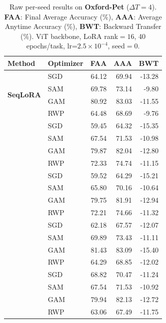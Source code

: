 \begin{table}[ht]
\centering
\caption{%
  Raw per-seed results on \textbf{Oxford-Pet} ($\Delta T=4$).
  \textbf{FAA}: Final Average Accuracy (\%), \textbf{AAA}: Average Anytime Accuracy (\%),
  \textbf{BWT}: Backward Transfer (\%).
  ViT backbone, LoRA rank$=16$, 40 epochs/task, lr=$2.5\times10^{-4}$, seed$=0$.
}
\label{tab:raw_oxford_pet}
\setlength{\tabcolsep}{4pt}
\renewcommand{\arraystretch}{0.92}
\small
\begin{tabular}{@{}l l r r r@{}}
\toprule
\textbf{Method} & \textbf{Optimizer} & \textbf{FAA} & \textbf{AAA} & \textbf{BWT} \\
\midrule
\multirow{4}{*}{\textbf{SeqLoRA}} & SGD & 64.12 & 69.94 & -13.28 \\
 & SAM & 69.78 & 73.14 & -9.80 \\
 & GAM & 80.92 & 83.03 & -11.55 \\
 & RWP & 64.48 & 68.69 & -9.76 \\
\addlinespace[3pt]
\multirow{4}{*}{\textbf{IncLoRA}} & SGD & 59.45 & 64.32 & -15.35 \\
 & SAM & 67.54 & 71.53 & -10.98 \\
 & GAM & 79.87 & 82.04 & -12.80 \\
 & RWP & 72.33 & 74.74 & -11.15 \\
\addlinespace[3pt]
\multirow{4}{*}{\textbf{OLoRA}} & SGD & 59.52 & 64.29 & -15.21 \\
 & SAM & 65.80 & 70.16 & -10.64 \\
 & GAM & 79.75 & 81.91 & -12.94 \\
 & RWP & 72.21 & 74.66 & -11.32 \\
\addlinespace[3pt]
\multirow{4}{*}{\textbf{InfLoRA}} & SGD & 62.18 & 67.57 & -12.07 \\
 & SAM & 69.89 & 73.43 & -11.11 \\
 & GAM & 81.43 & 83.09 & -15.40 \\
 & RWP & 64.29 & 68.85 & -12.02 \\
\addlinespace[3pt]
\multirow{4}{*}{\textbf{SDLoRA}} & SGD & 68.82 & 70.47 & -11.24 \\
 & SAM & 67.54 & 71.53 & -10.92 \\
 & GAM & 79.94 & 82.13 & -12.72 \\
 & RWP & 63.06 & 67.49 & -11.75 \\
\bottomrule
\end{tabular}
\end{table}
